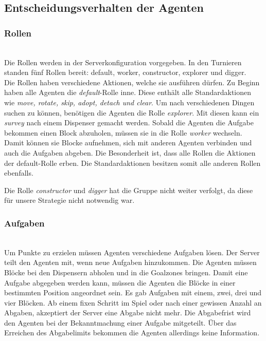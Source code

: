 \subsection{Entscheidungsverhalten der Agenten}

\subsubsection{Rollen} ~\\
Die Rollen werden in der Serverkonfiguration vorgegeben. In den Turnieren standen fünf Rollen bereit: default, worker, constructor, explorer und digger. \\
Die Rollen haben verschiedene Aktionen, welche sie ausführen dürfen. Zu Beginn haben alle Agenten die \textit{default}-Rolle inne. Diese enthält alle Standardaktionen wie \textit{move, rotate, skip, adopt, detach und clear}. Um nach verschiedenen Dingen suchen zu können, benötigen die Agenten die Rolle \textit{explorer}. Mit diesen kann ein \textit{survey} nach einem Dispenser gemacht werden. Sobald die Agenten die Aufgabe bekommen einen Block abzuholen, müssen sie in die Rolle \textit{worker} wechseln. Damit können sie Blocke aufnehmen, sich mit anderen Agenten verbinden und auch die Aufgaben abgeben. 
Die Besonderheit ist, dass alle Rollen die Aktionen der default-Rolle erben. Die Standardaktionen besitzen somit alle anderen Rollen ebenfalls.

Die Rolle \textit{constructor} und \textit{digger} hat die Gruppe nicht weiter verfolgt, da diese für unsere Strategie nicht notwendig war. 

\subsubsection{Aufgaben} ~\\
Um Punkte zu erzielen müssen Agenten verschiedene Aufgaben lösen. Der Server teilt den Agenten mit, wenn neue Aufgaben hinzukommen. Die Agenten müssen Blöcke bei den Dispensern abholen und in die Goalzones bringen. Damit eine Aufgabe abgegeben werden kann, müssen die Agenten die Blöcke in einer bestimmten Position angeordnet sein. Es gab Aufgaben mit einem, zwei, drei und vier Blöcken. Ab einem fixen Schritt im Spiel oder nach einer gewissen Anzahl an Abgaben, akzeptiert der Server eine Abgabe nicht mehr. Die Abgabefrist wird den Agenten bei der Bekanntmachung einer Aufgabe mitgeteilt. Über das Erreichen des Abgabelimits bekommen die Agenten allerdings keine Information.

